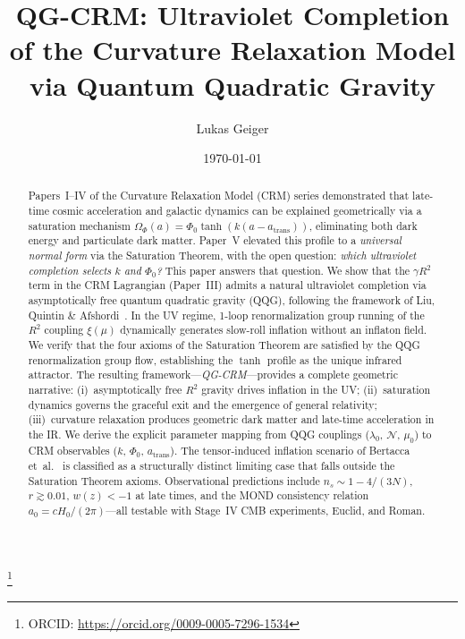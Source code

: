 \documentclass[aps,prd,twocolumn,superscriptaddress,nofootinbib]{revtex4-2}
\begin{document}

\title{QG-CRM: Ultraviolet Completion of the Curvature Relaxation Model\\via Quantum Quadratic Gravity}

\author{Lukas Geiger}
\thanks{ORCID: \url{https://orcid.org/0009-0005-7296-1534}}

\date{\today}

\begin{abstract}
Papers~I--IV of the Curvature Relaxation Model (CRM) series demonstrated that late-time cosmic acceleration and galactic dynamics can be explained geometrically via a saturation mechanism $\Omega_\Phi(a) = \Phi_0\tanh(k(a - a_\mathrm{trans}))$, eliminating both dark energy and particulate dark matter. Paper~V elevated this profile to a \textit{universal normal form} via the Saturation Theorem, with the open question: \textit{which ultraviolet completion selects $k$ and $\Phi_0$?} This paper answers that question. We show that the $\gamma R^2$ term in the CRM Lagrangian (Paper~III) admits a natural ultraviolet completion via asymptotically free quantum quadratic gravity (QQG), following the framework of Liu, Quintin \& Afshordi~\cite{LiuQuintinAfshordi2026}. In the UV regime, 1-loop renormalization group running of the $R^2$ coupling $\xi(\mu)$ dynamically generates slow-roll inflation without an inflaton field. We verify that the four axioms of the Saturation Theorem are satisfied by the QQG renormalization group flow, establishing the $\tanh$ profile as the unique infrared attractor. The resulting framework---\textit{QG-CRM}---provides a complete geometric narrative: (i)~asymptotically free $R^2$ gravity drives inflation in the UV; (ii)~saturation dynamics governs the graceful exit and the emergence of general relativity; (iii)~curvature relaxation produces geometric dark matter and late-time acceleration in the IR. We derive the explicit parameter mapping from QQG couplings ($\lambda_0$, $\mathcal{N}$, $\mu_0$) to CRM observables ($k$, $\Phi_0$, $a_\mathrm{trans}$). The tensor-induced inflation scenario of Bertacca et~al.~\cite{Bertacca2025} is classified as a structurally distinct limiting case that falls outside the Saturation Theorem axioms. Observational predictions include $n_s \sim 1 - 4/(3N)$, $r \gtrsim 0.01$, $w(z) < -1$ at late times, and the MOND consistency relation $a_0 = cH_0/(2\pi)$---all testable with Stage~IV CMB experiments, Euclid, and Roman.
\end{abstract}
\end{document}
